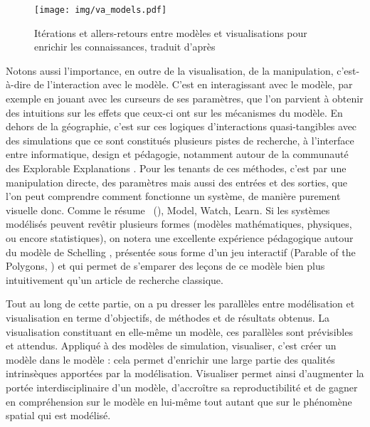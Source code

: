 \documentclass[a4paper, 12pt]{article}
\begin{document}
\begin{figure}[H]
	\centering
	\texttt{[image: img/va\_models.pdf]}

	\caption{Itérations et allers-retours entre modèles et visualisations pour enrichir les connaissances, traduit d'après \cite[fig.~1, p.~156]{keim_visual_2008}}
	\label{fig:schema-va}
\end{figure}

Notons aussi l'importance, en outre de la visualisation, de la manipulation, c'est-à-dire de l'interaction avec le modèle.
C'est en interagissant avec le modèle, par exemple en jouant avec les curseurs de ses paramètres, que l'on parvient à obtenir des intuitions sur les effets que ceux-ci ont sur les mécanismes du modèle.
En dehors de la géographie, c'est sur ces logiques d'interactions quasi-tangibles avec des simulations que ce sont constitués plusieurs pistes de recherche, à l'interface entre informatique, design et pédagogie, notamment autour de la communauté des \og Explorable Explanations\fg{} \autocite{case_explorable_2015}.
Pour les tenants de ces méthodes, c'est par une manipulation directe, des paramètres mais aussi des entrées et des sorties, que l'on peut comprendre comment fonctionne un système, de manière purement visuelle donc.
Comme le résume ~(\citeyear{victor_simulation_2009}), \og Model, Watch, Learn\fg{}.
Si les systèmes modélisés peuvent revêtir plusieurs formes (modèles mathématiques, physiques, ou encore statistiques), on notera une excellente expérience pédagogique autour du modèle de Schelling \autocite{schelling_dynamic_1971}, présentée sous forme d'un jeu interactif (\og Parable of the Polygons\fg{}, \textcite{hart2014parable}) et qui permet de s'emparer des leçons de ce modèle bien plus intuitivement qu'un article de recherche classique.

\bigskip 
Tout au long de cette partie, on a pu dresser les parallèles entre modélisation et visualisation en terme d'objectifs, de méthodes et de résultats obtenus.
La visualisation constituant en elle-même un modèle, ces parallèles sont prévisibles et attendus.
Appliqué à des modèles de simulation, visualiser, c'est créer \og un modèle dans le modèle\fg{} : cela permet d'enrichir une large partie des qualités intrinsèques apportées par la modélisation.
Visualiser permet ainsi d'augmenter la portée interdisciplinaire d'un modèle, d'accroître sa reproductibilité et de gagner en compréhension sur le modèle en lui-même tout autant que sur le phénomène spatial qui est modélisé.
\end{document}
